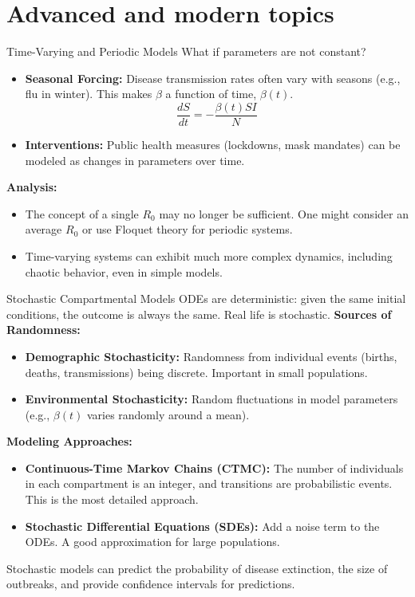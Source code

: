 \documentclass[aspectratio=169]{beamer}\usepackage[]{graphicx}\usepackage[]{xcolor}
\begin{document}
\section{Advanced and modern topics}

\begin{frame}{Time-Varying and Periodic Models}
    What if parameters are not constant?
    \begin{itemize}
        \item \textbf{Seasonal Forcing:} Disease transmission rates often vary with seasons (e.g., flu in winter). This makes $\beta$ a function of time, $\beta(t)$.
        $$ \frac{dS}{dt} = -\frac{\beta(t) S I}{N} $$
        \item \textbf{Interventions:} Public health measures (lockdowns, mask mandates) can be modeled as changes in parameters over time.
    \end{itemize}
    \vfill
    \textbf{Analysis:}
    \begin{itemize}
        \item The concept of a single $R_0$ may no longer be sufficient. One might consider an average $R_0$ or use Floquet theory for periodic systems.
        \item Time-varying systems can exhibit much more complex dynamics, including chaotic behavior, even in simple models.
    \end{itemize}
\end{frame}

\begin{frame}{Stochastic Compartmental Models}
    ODEs are deterministic: given the same initial conditions, the outcome is always the same. Real life is stochastic.
    \vfill
    \textbf{Sources of Randomness:}
    \begin{itemize}
        \item \textbf{Demographic Stochasticity:} Randomness from individual events (births, deaths, transmissions) being discrete. Important in small populations.
        \item \textbf{Environmental Stochasticity:} Random fluctuations in model parameters (e.g., $\beta(t)$ varies randomly around a mean).
    \end{itemize}
    \vfill
    \textbf{Modeling Approaches:}
    \begin{itemize}
        \item \textbf{Continuous-Time Markov Chains (CTMC):} The number of individuals in each compartment is an integer, and transitions are probabilistic events. This is the most detailed approach.
        \item \textbf{Stochastic Differential Equations (SDEs):} Add a noise term to the ODEs. A good approximation for large populations.
    \end{itemize}
    \vfill
    Stochastic models can predict the probability of disease extinction, the size of outbreaks, and provide confidence intervals for predictions.
\end{frame}
\end{document}
